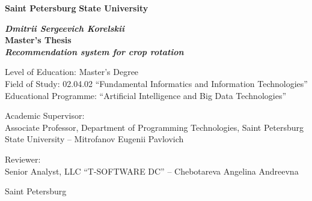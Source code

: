 \begin{titlepage}
\begin{center}

\textbf{Saint Petersburg}
\textbf{State University}

\vspace{35mm}

\textbf{\textit{\large Dmitrii Sergeevich Korelskii}} \\[8mm]
\textbf{\large Master's Thesis}\\[3mm]
\textbf{\textit{\large Recommendation system for crop rotation}}

\vspace{20mm}
Level of Education: Master's Degree\\
Field of Study: 02.04.02 ``Fundamental Informatics and Information Technologies''\\
Educational Programme: ``Artificial Intelligence and Big Data Technologies''\\[25mm]

\begin{flushright}
\begin{minipage}[t]{0.65\textwidth}
{Academic Supervisor:} \\
Associate Professor, Department of Programming Technologies,
Saint Petersburg State University -- Mitrofanov Eugenii Pavlovich

\vspace{10mm}

{Reviewer:} \\
Senior Analyst, LLC ``T-SOFTWARE DC'' -- Chebotareva Angelina Andreevna
\end{minipage}
\end{flushright}

\vfill
{Saint Petersburg}
\par{\the\year}
\end{center}
\end{titlepage}
\restoregeometry
\addtocounter{page}{1}